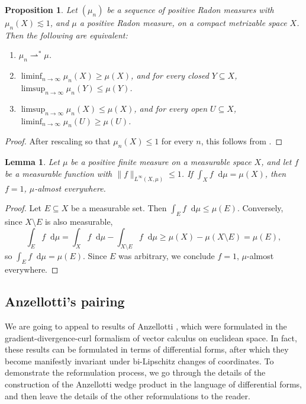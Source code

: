 \documentclass[reqno,11pt]{amsart}
\newcommand*\dif{\mathop{}\!\mathrm{d}}
\newcommand{\weakto}{\rightharpoonup}
\newtheorem{lemma}[theorem]{Lemma}
\newtheorem{proposition}[theorem]{Proposition}
\theoremstyle{definition}
\numberwithin{equation}{section}
\begin{document}
\begin{proposition}\label{portmanteau}
Let $(\mu_n)$ be a sequence of positive Radon measures with $\mu_n(X) \lesssim 1$, and $\mu$ a positive Radon measure, on a compact metrizable space $X$.
Then the following are equivalent:
\begin{enumerate}
\item $\mu_n \weakto^* \mu$.
\item $\liminf_{n \to \infty} \mu_n(X) \geq \mu(X)$, and for every closed $Y \subseteq X$, $\limsup_{n \to \infty} \mu_n(Y) \leq \mu(Y)$.
\item $\limsup_{n \to \infty} \mu_n(X) \leq \mu(X)$, and for every open $U \subseteq X$, $\liminf_{n \to \infty} \mu_n(U) \geq \mu(U)$.
\end{enumerate}
\end{proposition}
\begin{proof}
After rescaling so that $\mu_n(X) \leq 1$ for every $n$, this follows from \cite[Theorem 13.16]{klenke2013probability}.
\end{proof}

\begin{lemma}\label{measurable function is 1}
Let $\mu$ be a positive finite measure on a measurable space $X$, and let $f$ be a measurable function with $\|f\|_{L^\infty(X, \mu)} \leq 1$.
If $\int_X f \dif \mu = \mu(X)$, then $f = 1$, $\mu$-almost everywhere.
\end{lemma}
\begin{proof}
Let $E \subseteq X$ be a measurable set.
Then $\int_E f \dif \mu \leq \mu(E)$.
Conversely, since $X \setminus E$ is also measurable,
$$\int_E f \dif \mu = \int_X f \dif \mu - \int_{X \setminus E} f \dif \mu \geq \mu(X) - \mu(X \setminus E) = \mu(E),$$
so $\int_E f \dif \mu = \mu(E)$.
Since $E$ was arbitrary, we conclude $f = 1$, $\mu$-almost everywhere.
\end{proof}


\subsection{Anzellotti's pairing}
We are going to appeal to results of Anzellotti \cite{Anzellotti1983}, which were formulated in the gradient-divergence-curl formalism of vector calculus on euclidean space.
In fact, these results can be formulated in terms of differential forms, after which they become manifestly invariant under bi-Lipschitz changes of coordinates.
To demonstrate the reformulation process, we go through the details of the construction of the Anzellotti wedge product in the language of differential forms, and then leave the details of the other reformulations to the reader.
\end{document}
